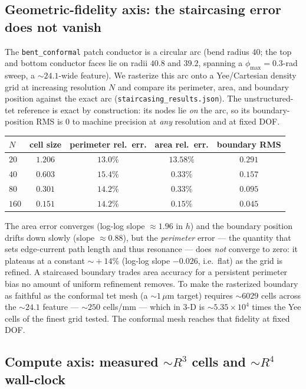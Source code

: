 \documentclass{anvil-paper}
\begin{document}
\subsection{Geometric-fidelity axis: the staircasing error does not vanish}
\label{sec:staircase}

The \texttt{bent\_conformal} patch conductor is a circular arc (bend radius $40$;
the top and bottom conductor faces lie on radii $40.8$ and $39.2$, spanning a
$\phi_{\max}=0.3$-rad sweep, a $\sim\!24.1$-wide feature). We rasterize this arc
onto a Yee/Cartesian density grid at increasing resolution $N$ and compare its
perimeter, area, and boundary position against the exact arc
(\texttt{staircasing\_results.json}). The unstructured-tet reference is exact by
construction: its nodes lie \emph{on} the arc, so its boundary-position RMS is
$0$ to machine precision at \emph{any} resolution and at fixed DOF.

\begin{center}
\begin{tabular}{lcccc}
\toprule
$N$ & cell size & perimeter rel.\ err. & area rel.\ err. & boundary RMS \\
\midrule
$20$  & $1.206$ & $13.0\%$ & $13.58\%$ & $0.291$ \\
$40$  & $0.603$ & $15.4\%$ & $0.33\%$  & $0.157$ \\
$80$  & $0.301$ & $14.2\%$ & $0.33\%$  & $0.095$ \\
$160$ & $0.151$ & $14.2\%$ & $0.15\%$  & $0.045$ \\
\bottomrule
\end{tabular}
\end{center}

The area error converges (log-log slope $\approx\!1.96$ in $h$) and the boundary
position drifts down slowly (slope $\approx\!0.88$), but the \emph{perimeter}
error --- the quantity that sets edge-current path length and thus resonance ---
does \emph{not} converge to zero: it plateaus at a constant $\sim\!+14\%$
(log-log slope $-0.026$, i.e.\ flat) as the grid is refined. A staircased
boundary trades area accuracy for a persistent perimeter bias no amount of
uniform refinement removes. To make the rasterized boundary as faithful as the
conformal tet mesh (a $\sim\!1\,\mu$m target) requires $\sim\!6029$ cells across
the $\sim\!24.1$ feature --- $\sim\!250$ cells/mm --- which in 3-D is
$\sim\!5.35\times10^{4}$ times the Yee cells of the finest grid tested. The
conformal mesh reaches that fidelity at fixed DOF.

\subsection{Compute axis: measured $\sim\!R^3$ cells and $\sim\!R^4$ wall-clock}
\label{sec:runtime}
\end{document}
